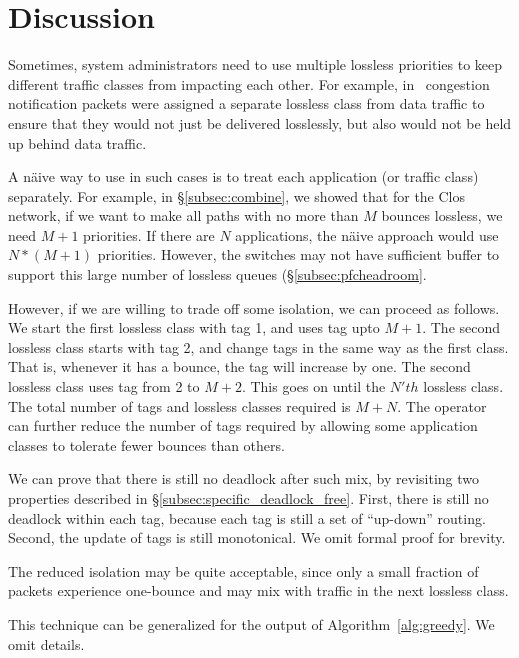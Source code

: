 \section{Discussion}

 Sometimes, system administrators need to
use multiple lossless priorities to keep different traffic classes from impacting each
other. For example, in~\cite{dcqcn} congestion notification packets were
assigned a separate lossless class from data traffic to ensure that they would
not just be delivered losslessly, but also would not be held up behind data
traffic.

A n{\"a}ive way to use \sysname{} in such cases is to treat each application (or
traffic class) separately.  For example, in \S\ref{subsec:combine}, we showed
that for the Clos network, if we want to make  all paths with no more than $M$
bounces lossless, we need $M+1$ priorities. If there are $N$ applications, the
n{\"a}ive approach would use $N*(M+1)$ priorities.  However, the switches may
not have sufficient buffer to support this large number of lossless queues
(\S\ref{subsec:pfcheadroom}.

However, if we are willing to trade off some isolation, we can proceed as
follows.  We start the first lossless class with tag 1, and uses tag upto $M+1$.
The second lossless class starts with tag 2, and change tags in the same way as
the first class.  That is, whenever it has a bounce, the tag will increase by
one. The second lossless class uses tag from 2 to $M+2$. This goes on until the
$N'th$ lossless class. The total number of tags and lossless classes required is
$M + N$. The operator can further reduce the number of tags required by allowing
some application classes to tolerate fewer bounces than others.

We can prove that there is still no deadlock after such mix, by revisiting two
properties described in \S\ref{subsec:specific_deadlock_free}. First, there is
still no deadlock within each tag, because each tag is still a set of
``up-down'' routing. Second, the update of tags is still monotonical. We omit
formal proof for brevity. 

The reduced isolation may be quite acceptable, since only a small
fraction of packets experience one-bounce and may mix with traffic in the next
lossless class. 

This technique can be generalized for the output of Algorithm~\ref{alg:greedy}.
We omit details.

 

